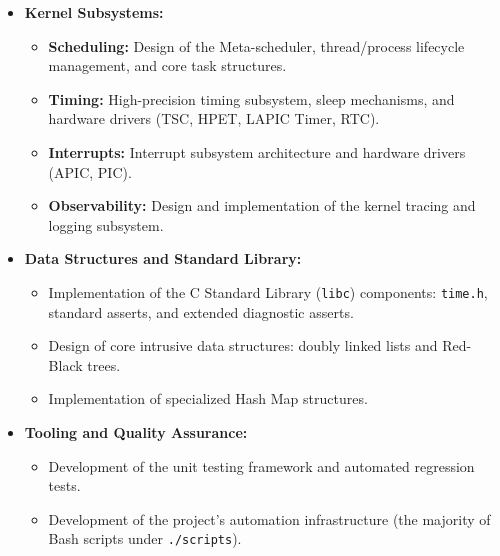 \documentclass[a4paper,10pt,twoside]{report}
\theoremstyle{definition}
\begin{document}
\begin{itemize}
\begin{itemize}
        \item Chapter \ref{sec:results} --- Results:
        \begin{itemize}
            \item Section \ref{sec:results} --- Results and Conclusions.
        \end{itemize}
    \end{itemize}

    \item \textbf{Kernel Subsystems:}
        \begin{itemize}
            \item \textbf{Scheduling:} Design of the Meta-scheduler, thread/process lifecycle management, and core task structures.
            \item \textbf{Timing:} High-precision timing subsystem, sleep mechanisms, and hardware drivers (TSC, HPET, LAPIC Timer, RTC).
            \item \textbf{Interrupts:} Interrupt subsystem architecture and hardware drivers (APIC, PIC).
            \item \textbf{Observability:} Design and implementation of the kernel tracing and logging subsystem.
        \end{itemize}

    \item \textbf{Data Structures and Standard Library:}
        \begin{itemize}
            \item Implementation of the C Standard Library (\texttt{libc}) components: \texttt{time.h}, standard asserts, and extended diagnostic asserts.
            \item Design of core intrusive data structures: doubly linked lists and Red-Black trees.
            \item Implementation of specialized Hash Map structures.
        \end{itemize}

    \item \textbf{Tooling and Quality Assurance:}
        \begin{itemize}
            \item Development of the unit testing framework and automated regression tests.
            \item Development of the project's automation infrastructure (the majority of Bash scripts under \texttt{./scripts}).
        \end{itemize}
\end{itemize}
\end{document}
